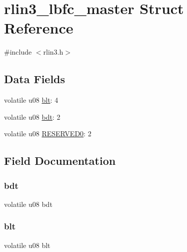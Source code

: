 \hypertarget{structrlin3__lbfc__master}{}\section{rlin3\+\_\+lbfc\+\_\+master Struct Reference}
\label{structrlin3__lbfc__master}


{\ttfamily \#include $<$rlin3.\+h$>$}

\subsection*{Data Fields}
\begin{DoxyCompactItemize}
\item 
volatile u08 \mbox{\hyperlink{structrlin3__lbfc__master_a0b36573b2fa84300cb61c60ca2533ea2}{blt}}\+: 4
\item 
volatile u08 \mbox{\hyperlink{structrlin3__lbfc__master_a9cd9814b1e4a08becaf806b9b63f8165}{bdt}}\+: 2
\item 
volatile u08 \mbox{\hyperlink{structrlin3__lbfc__master_a59c0b30ccfb89f1b34e9682741859abd}{R\+E\+S\+E\+R\+V\+E\+D0}}\+: 2
\end{DoxyCompactItemize}


\subsection{Field Documentation}
\mbox{\label{structrlin3__lbfc__master_a9cd9814b1e4a08becaf806b9b63f8165}} 
\subsubsection{\texorpdfstring{bdt}{bdt}}
{\footnotesize\ttfamily volatile u08 bdt}

\mbox{\label{structrlin3__lbfc__master_a0b36573b2fa84300cb61c60ca2533ea2}} 
\subsubsection{\texorpdfstring{blt}{blt}}
{\footnotesize\ttfamily volatile u08 blt}


